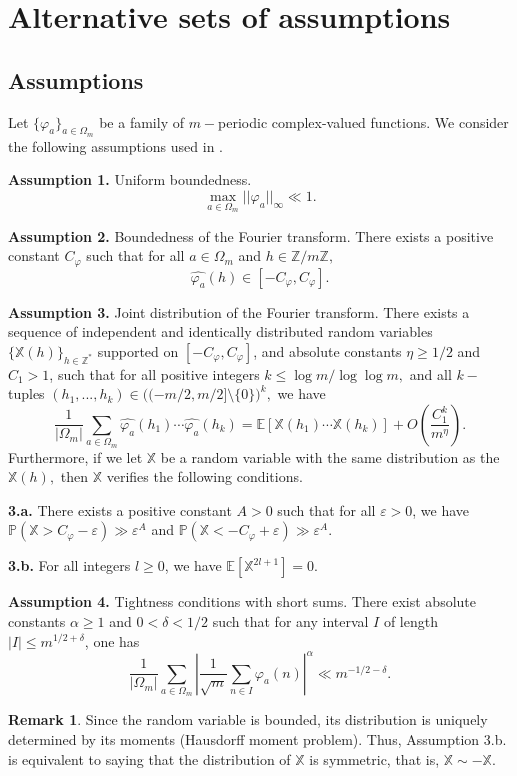 \documentclass[12pt]{amsart}
\theoremstyle{definition}
\newtheorem{rem}{Remark}
\numberwithin{equation}{section}
\numberwithin{equation}{section}
\def\E{\mathbb{E}}
\def\P{\mathbb{P}}
\def\Z{\mathbb{Z}}
\def\Mp{C_\varphi}
\def\X{\mathbb{X}}
\def\E{\mathbb{E}}
\begin{document}
\section{Alternative sets of assumptions}

\subsection{Assumptions}

Let $\{\varphi_a\}_{a\in\Omega_m}$ be a family of $m-$periodic 
complex-valued functions. We consider the following assumptions used in \cite{ABL21}.

\textbf{Assumption 1.} Uniform boundedness.
\[\max_{a\in\Omega_m} ||\varphi_a||_\infty\ll 1.\]

\textbf{Assumption 2.} Boundedness of the Fourier transform. There exists a positive constant $\Mp$ such that for all $a\in\Omega_m$ and $h\in \Z /m\Z,$
\[\widehat{\varphi_a}(h)\in [-\Mp,\Mp].
\]

\textbf{Assumption 3.} Joint distribution of the Fourier transform. 
There exists a sequence of independent and identically distributed random variables $\{\X(h)\}_{h\in\Z^*}$ supported on $[-\Mp,\Mp]$, and absolute constants $\eta\geq 1/2$ and $C_1>1$, such that for all positive integers $k\leq \log m/\log\log m,$ and all $k-$tuples $(h_1, ...,h_k)\in\big((-m/2, m/2]\setminus \{0\}\big)^k,$ we have
\[
\frac{1}{|\Omega_m|}\sum_{a\in\Omega_m} \widehat{\varphi_a}(h_1)\cdots \widehat{\varphi_a}(h_k)
 =
 \E[\X(h_1)\cdots \X(h_k)] +O\left(\frac{C_1^k}{m^{\eta}}\right).
\]
Furthermore, if we let $\X$ be a random variable with the same distribution as the $\X(h),$ then $\X$ verifies the following conditions.

\textbf{3.a.} There exists a positive constant $A>0$ such that for all $\varepsilon >0$, we have $\P(\X>\Mp-\varepsilon)\gg \varepsilon^A$ and $\P(\X<-\Mp+\varepsilon)\gg \varepsilon^A$.

\textbf{3.b.} For all integers $l\geq 0$, we have $\E[\X^{2l+1}] =0$.

\textbf{Assumption 4.} Tightness conditions with short sums. There exist absolute constants $\alpha\geq 1$ and $0<\delta<1/2$ such that for any interval $I$ of length $|I|\leq m^{1/2+\delta}$, one has
\[
\frac{1}{|\Omega_m|}\sum_{a\in \Omega_m} \left|
\frac{1}{\sqrt{m}}\sum_{n\in I} \varphi_a(n)\right|^\alpha \ll m^{-1/2-\delta}.
\]

\begin{rem}
Since the random variable is bounded, its distribution is uniquely determined by its moments (Hausdorff moment problem). Thus, Assumption 3.b. is equivalent to saying that the distribution of \(\X\) is symmetric, that is, $\X\sim -\X$.
\end{rem}
\end{document}
